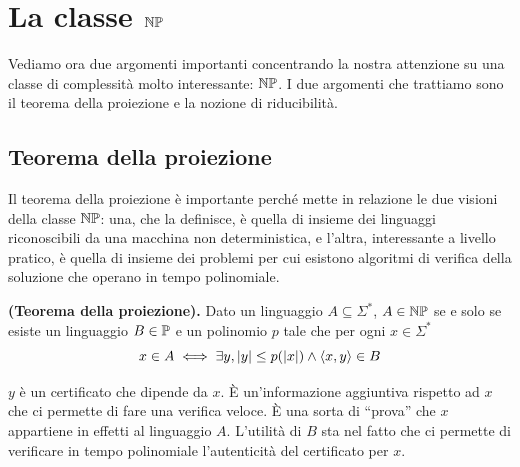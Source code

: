 %
%
%
%
\chapter{La classe $\mathbb{NP}$}

Vediamo ora due argomenti importanti concentrando la nostra attenzione su una classe di complessità
molto interessante: $\mathbb{NP}$. I due argomenti che trattiamo sono il teorema della proiezione e la
nozione di riducibilità.

\section{Teorema della proiezione}

Il teorema della proiezione è importante perché mette in relazione le due visioni della classe
$\mathbb{NP}$: una, che la definisce, è quella di insieme dei linguaggi riconoscibili da una macchina
non deterministica, e l'altra, interessante a livello pratico, è quella di insieme dei problemi per
cui esistono algoritmi di verifica della soluzione che operano in tempo polinomiale.

\begin{thm}
    \textbf{(Teorema della proiezione).} Dato un linguaggio $A \subseteq \Sigma^{*}$, $A \in
    \mathbb{NP}$ se e solo se esiste un linguaggio $B \in \mathbb{P}$ e un polinomio $p$ tale che per ogni
    $x \in \Sigma^{*}$
    \begin{equation*}
        x \in A \iff \exists y, |y| \leq p(|x|) \land \langle x, y \rangle \in B
    \end{equation*}
\end{thm}

$y$ è un certificato che dipende da $x$. È un'informazione aggiuntiva rispetto ad $x$ che ci
permette di fare una verifica veloce. È una sorta di ``prova'' che $x$ appartiene in effetti al
linguaggio $A$. L'utilità di $B$ sta nel fatto che ci permette di verificare in tempo polinomiale
l'autenticità del certificato per $x$.

